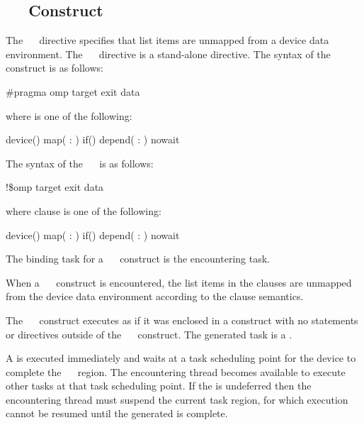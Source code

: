 %
%
\subsection{~~ Construct}
\label{subsec:target exit data Construct}
\summary
The ~~ directive specifies that list items are unmapped from a device data environment. The ~~ directive is a stand-alone directive.
\syntax
\ccppspecificstart
The syntax of the ~~ construct is as follows:
\begin{boxedcode}
\#pragma omp target exit data 
\end{boxedcode}
where  is one of the following:
\begin{indentedcodelist}
device()
map(\plc{[ [map-type-modifier[,]] map-type} : \plc{] list})
if()
depend( : )
nowait
\end{indentedcodelist}
\ccppspecificend
\fortranspecificstart
The syntax of the ~~ is as follows:
\begin{boxedcode}
!\$omp target exit data 
\end{boxedcode}
where clause is one of the following:
\begin{indentedcodelist}
device()
map(\plc{[ [map-type-modifier[,]] map-type} : \plc{] list})
if()
depend( : )
nowait
\end{indentedcodelist}
\fortranspecificend
\binding
The binding task for a ~~ construct is the encountering task. 

\descr
When a ~~ construct is encountered, the list items in the  clauses are unmapped from the device data environment according to the  clause semantics.

The ~~ construct executes as if it was enclosed in a  construct with no statements or directives outside of the ~~ construct. The generated task is a .

A  is executed immediately and waits at a task scheduling point for the device to complete the ~~ region. The encountering thread becomes available to execute other tasks at that task scheduling point. If the  is undeferred then the encountering thread must suspend the current task region, for which execution cannot be resumed until the generated  is complete.


